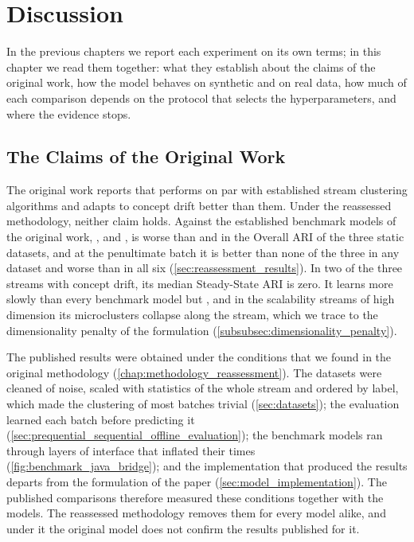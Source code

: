 \chapter{Discussion}
\label{chap:discussion}

In the previous chapters we report each experiment on its own terms; in this chapter we read them together: what they establish about the claims of the original work, how the model behaves on synthetic and on real data, how much of each comparison depends on the protocol that selects the hyperparameters, and where the evidence stops.

\section{The Claims of the Original Work}
\label{sec:disc_claims}

The original work reports that \MicroTEDAClus performs on par with established stream clustering algorithms and adapts to concept drift better than them. Under the reassessed methodology, neither claim holds. Against the established benchmark models of the original work, \DenStream, \CluStream and \StreamKM, \MicroTEDAClus is worse than \CluStream and \StreamKM in the Overall ARI of the three static datasets, and at the penultimate batch it is better than none of the three in any dataset and worse than \StreamKM in all six (\cref{sec:reassessment_results}). In two of the three streams with concept drift, its median Steady-State ARI is zero. It learns more slowly than every benchmark model but \AutoCloud, and in the scalability streams of high dimension its microclusters collapse along the stream, which we trace to the dimensionality penalty of the formulation (\cref{subsubsec:dimensionality_penalty}).

The published results were obtained under the conditions that we found in the original methodology (\cref{chap:methodology_reassessment}). The datasets were cleaned of noise, scaled with statistics of the whole stream and ordered by label, which made the clustering of most batches trivial (\cref{sec:datasets}); the evaluation learned each batch before predicting it (\cref{sec:prequential_sequential_offline_evaluation}); the benchmark models ran through layers of interface that inflated their times (\cref{fig:benchmark_java_bridge}); and the implementation that produced the results departs from the formulation of the paper (\cref{sec:model_implementation}). The published comparisons therefore measured these conditions together with the models. The reassessed methodology removes them for every model alike, and under it the original model does not confirm the results published for it.

